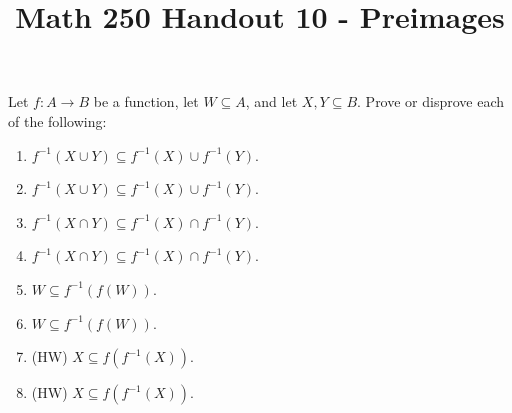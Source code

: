 \documentclass[12pt, reqno]{amsart}
\begin{document}
\title[Math 250 Handout 10 - Preimages]{Math 250 Handout 10  - Preimages}\maketitle


  Let $f\colon A \to B$ be a function, let $W \subseteq A$, and let $X,Y \subseteq B$. Prove
  or disprove each of the following:  
\begin{enumerate}
  \item $f^{-1}(X \cup Y) \subseteq f^{-1}(X) \cup f^{-1}(Y)$.
  \item $f^{-1}(X \cup Y) \subseteq f^{-1}(X) \cup f^{-1}(Y)$.
  \item $f^{-1}(X \cap Y) \subseteq f^{-1}(X) \cap f^{-1}(Y)$.
  \item $f^{-1}(X \cap Y) \subseteq f^{-1}(X) \cap f^{-1}(Y)$.
  \item $W \subseteq f^{-1}(f(W))$.
  \item $W \subseteq f^{-1}(f(W))$.
  \item (HW) $X \subseteq f(f^{-1}(X))$.
  \item (HW) $X \subseteq f(f^{-1}(X))$.
\end{enumerate}  
\end{document}
